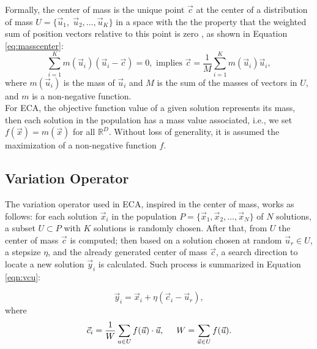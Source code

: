 \documentclass[12pt,letterpape]{article}
\begin{document}
Formally, the center of mass is the unique point $\vec{c}$ at the center of a 
distribution of mass $U = \{\vec{u}_1,\; \vec{u}_2 , \ldots , \vec{u}_K \}$ in a 
space with the the property that the weighted sum of position vectors relative 
to this point is zero \cite{kleppner73,serway}, as shown in Equation \ref{eq:masscenter}:
%
%
\begin{equation}
	\sum_{i = 1}^K m(\vec{u}_i) (\vec{u}_i - \vec{c}) = 0, \text{ implies } 
	\vec{c} = \dfrac{1}{M} \sum_{i = 1}^K  m(\vec{u}_i)  \vec{u}_i,
	\label{eq:masscenter}
\end{equation}
%
%
where $m(\vec{u}_i)$ is the mass of $\vec{u}_i$ and  $M$ is the sum of the 
masses of vectors in $U$, and $m$ is a non-negative function.\\


For ECA, the objective function value of a given solution represents
its mass, then each solution in the population has a mass value associated,  i.e., 
we set $f(\vec{x}) = m(\vec{x})$ for all $\mathbb{R}^D$. Without loss of generality, 
it is assumed the maximization of a non-negative function $f$.


\subsection{Variation Operator} %
\label{sub:algorithm_description}

The variation operator used in ECA, inspired in the center of mass, works as follows: 
for each solution $\vec{x}_i $ in the population $P = \{ \vec{x}_1, \vec{x}_2, \ldots, \vec{x}_{N} \} $ of $N$ 
solutions, a subset $U \subset P $ with $K$ solutions is randomly chosen. After 
that, from $U$ the center of mass $\vec{c}$ is computed; then based on  a solution 
chosen at random $\vec{u}_r \in U$, a stepsize $\eta$, and the already generated 
center of mass $\vec{c}$, a search direction to locate a new solution $ \vec{y}_i$ 
is calculated. Such process is summarized in Equation \ref{eqn:vcu}:

\begin{equation}
	\vec{y}_i = \vec{x}_i + \eta ( \vec{c}_i - \vec{u}_{r} ),
	\label{eqn:vcu}
\end{equation}
%
where 
%
\begin{equation}
	\vec{c}_i = \dfrac{1} {W} \sum_{u \in U} f(\vec{u}) \cdot \vec{u} , 
			\hspace{0.5cm} 
			W = \sum_{ \vec{u} \in U} f(\vec{u}).
	\label{eqn:center}
\end{equation}
\end{document}
